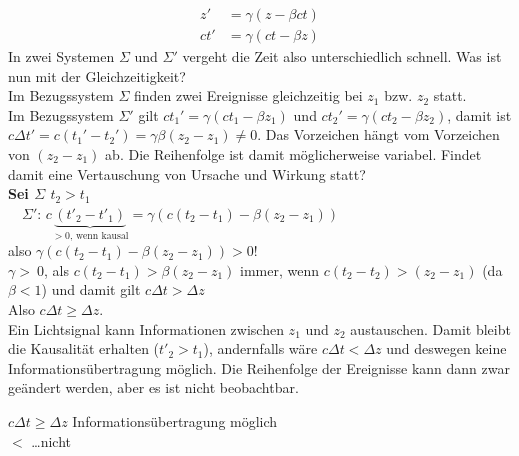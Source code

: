 \begin{folgerung*}
	\begin{align*}
		z'  &= \gamma (z - \beta c t)\\
		ct' &= \gamma (ct - \beta z)
	\end{align*}
	In zwei Systemen $\Sigma$ und $\Sigma'$ vergeht die Zeit also unterschiedlich schnell. Was ist nun mit der Gleichzeitigkeit?\\
	Im Bezugssystem $\Sigma$ finden zwei Ereignisse gleichzeitig bei $z_1$ bzw. $z_2$ statt.\\
	Im Bezugssystem $\Sigma'$ gilt $ct_1' = \gamma (ct_1 - \beta z_1)$ und $ct_2' = \gamma (ct_2 - \beta z_2)$, damit ist $c \Delta t' = c(t_1'- t_2') = \gamma\beta (z_2 - z_1) \neq 0$.
	Das Vorzeichen hängt vom Vorzeichen von $(z_2 - z_1)$ ab. Die Reihenfolge ist damit möglicherweise variabel. Findet damit eine	Vertauschung von Ursache und Wirkung statt?\\
	\textbf{Sei $\Sigma$ $t_2 > t_1$}\\
	~~$\Sigma'$: $c\underbrace{(t'_2 - t'_1)}_{> 0 \text{, wenn kausal}} = \gamma (c (t_2 - t_1) - \beta (z_2 - z_1))$\\
	also $\gamma (c (t_2 - t_1) - \beta (z_2 - z_1)) > 0!$\\
		$\gamma >~0$, als $c (t_2 - t_1) > \beta (z_2 - z_1)$ immer, wenn $c(t_2 - t_2) > (z_2 - z_1)$ (da $\beta < 1$) und damit gilt $c \Delta t > \Delta z$\\
	Also $c \Delta t \geq \Delta z$.\\
		Ein Lichtsignal kann Informationen zwischen $z_1$ und $z_2$ austauschen. Damit bleibt die Kausalität erhalten ($t'_2 > t_1$), andernfalls wäre $c \Delta t < \Delta z$ und deswegen keine Informationsübertragung möglich. Die Reihenfolge der Ereignisse kann dann zwar geändert werden, aber es ist nicht beobachtbar.
\end{folgerung*}

$c \Delta t \geq \Delta z$ Informationsübertragung möglich\\
$<$ \dots nicht\\

